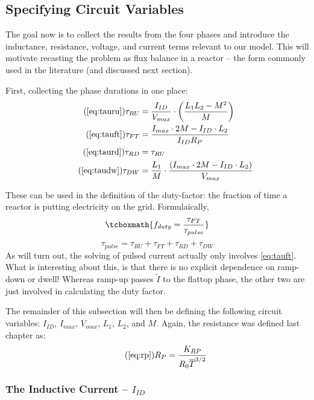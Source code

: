 \subsection{Specifying Circuit Variables}

The goal now is to collect the results from the four phases and introduce the inductance, resistance, voltage, and current terms relevant to our model. This will motivate recasting the problem as flux balance in a reactor -- the form commonly used in the literature (and discussed next section).

First, collecting the phase durations in one place:
\begin{align}
	\tag{\ref{eq:tauru}}
	\tau_{RU} &= \frac{I_{ID}}{V_{max}} \cdot \left( \frac{ L_1 L_2 - M^2 }{ M } \right) \\
	\tag{\ref{eq:tauft}}
	\tau_{FT} &= \frac{ I_{max} \cdot 2 M - I_{ID} \cdot  L_2 }{I_{ID} R_P} \\
	\tag{\ref{eq:taurd}}
	\tau_{RD} &= \tau_{RU} \\
	\tag{\ref{eq:taudw}}
	\tau_{DW} &= \frac{L_1}{M} \cdot \frac{ \left( I_{max} \cdot 2 M - I_{ID} \cdot  L_2 \right) }{V_{max}}
\end{align}

These can be used in the definition of the duty-factor: the fraction of time a reactor is putting electricity on the grid. Formulaically,
\begin{equation}
	\label{eq:duty}
	\tcboxmath{
	f_{duty} = \frac{\tau_{FT}}{\tau_{pulse}}
	}
\end{equation}
\begin{equation}
	\tau_{pulse} = \tau_{RU} + \tau_{FT} + \tau_{RD} + \tau_{DW}
\end{equation}
As will turn out, the solving of pulsed current actually only involves \cref{eq:tauft}. What is interesting about this, is that there is no explicit dependence on ramp-down or dwell! Whereas ramp-up passes $\tilde I$ to the flattop phase, the other two are just involved in calculating the duty factor.

The remainder of this subsection will then be defining the following circuit variables: $I_{ID}$, $I_{max}$, $V_{max}$, $L_1$, $L_2$, and $M$. Again, the resistance was defined last chapter as:
\begin{equation}
	\tag{\ref{eq:rp}}
	R_P = \frac{K_{RP}}{R_0 \overline T ^ {3/2}}
\end{equation}

\subsubsection{The Inductive Current -- $I_{ID}$}

